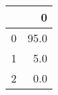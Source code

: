 \begin{tabular}{lr}
\toprule
{} &     0 \\
\midrule
0 &  95.0 \\
1 &   5.0 \\
2 &   0.0 \\
\bottomrule
\end{tabular}
